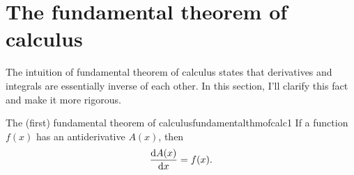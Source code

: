 \section{The fundamental theorem of calculus}
\label{sec:fundamentalthmofcalc}

The intuition of fundamental theorem of calculus states that derivatives and integrals are essentially inverse of each other. In this section, I'll clarify this fact and make it more rigorous.
\begin{thm}{The (first) fundamental theorem of calculus}{fundamentalthmofcalc1}
    If a function $f(x)$ has an antiderivative $A(x)$, then
    \begin{equation}
        \dv{A(x)}{x} = f(x).
    \end{equation}
\end{thm}

